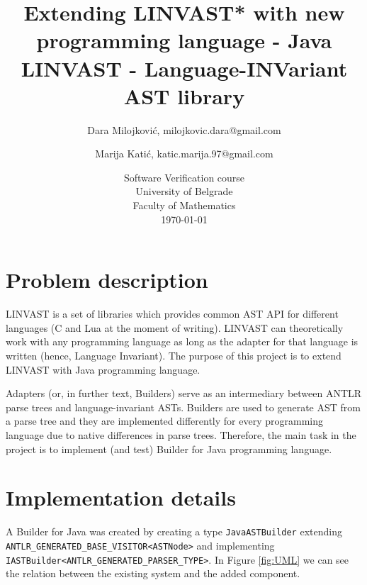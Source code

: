 \documentclass[a4paper]{article}
\begin{document}
\title{Extending LINVAST* with new programming language - Java \\[\baselineskip]
\large *LINVAST - Language-INVariant AST library}


\author{Dara Milojković, milojkovic.dara@gmail.com \and Marija Katić, katic.marija.97@gmail.com}

\date{Software Verification course \\ University of Belgrade \\Faculty of Mathematics\\[\baselineskip] \today}

\maketitle

\tableofcontents

\section{Problem description}
\label{sec:problem_description}
LINVAST is a set of libraries which provides common AST API for different languages (C and Lua at the moment of writing). LINVAST can theoretically work with any programming language as long as the adapter for that language is written (hence, Language Invariant).
The purpose of this project is to extend LINVAST with Java programming language.

Adapters (or, in further text, Builders) serve as an intermediary between ANTLR parse trees and language-invariant ASTs. Builders are used to generate AST from a parse tree and they are implemented differently for every programming language due to native differences in parse trees.
Therefore, the main task in the project is to implement (and test) Builder for Java programming language.

\section{Implementation details}
\label{sec:implementation_details}

A Builder for Java was created by creating a type \texttt{JavaASTBuilder} extending \texttt{ANTLR\_GENERATED\_BASE\_VISITOR<ASTNode>} and implementing \\
\texttt{IASTBuilder<ANTLR\_GENERATED\_PARSER\_TYPE>}. In Figure \ref{fig:UML} we can see  the relation between the existing system and the added component.
\end{document}
